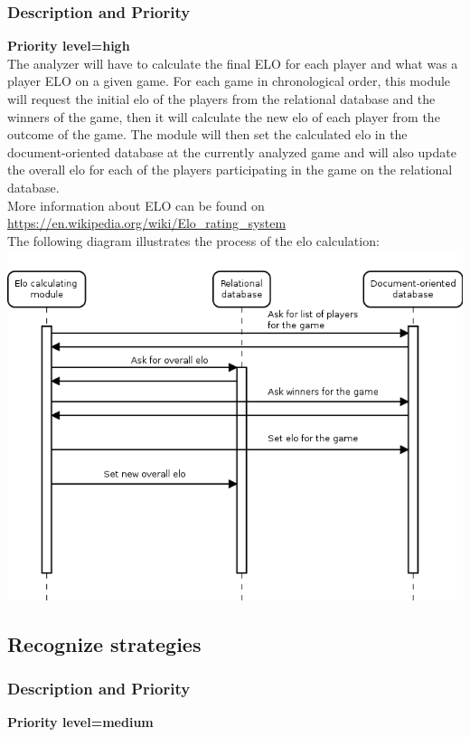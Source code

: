 \documentclass{scrreprt}
\begin{document}
\subsubsection{Description and Priority}
\textbf{Priority level=high}\\
The analyzer will have to calculate the final ELO for each player and what was a
player ELO on a given game.
For each game in chronological order, this module will request the initial elo of the players from the relational database and the winners of the game, then it will calculate the new elo of each player from the outcome of the game. The module will then set the calculated elo in the document-oriented database at the currently analyzed game and will also update the overall elo for each of the players participating in the game on the relational database.\\
More information about ELO can be found on \url{https://en.wikipedia.org/wiki/Elo_rating_system}\\
The following diagram illustrates the process of the elo calculation:\\
\includegraphics[width=\textwidth,height=\textheight,keepaspectratio]{elocalc}\\

\subsection{Recognize strategies}
\subsubsection{Description and Priority}
\textbf{Priority level=medium}\\
\end{document}

